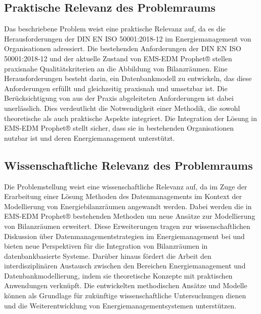 \subsection{Praktische Relevanz des Problemraums} 
Das beschriebene Problem weist eine praktische Relevanz auf, da es die Herausforderungen der DIN EN ISO 50001:2018-12
im Energiemanagement von Organisationen adressiert.
Die bestehenden Anforderungen der DIN EN ISO 50001:2018-12 und der aktuelle Zustand von EMS-EDM Prophet® stellen praxisnahe Qualitätskriterien an die Abbildung von Bilanzräumen.
Eine Herausforderungen besteht darin, ein Datenbankmodell zu entwickeln, das diese Anforderungen erfüllt und gleichzeitig praxisnah und umsetzbar ist.
Die Berücksichtigung von aus der Praxis abgeleiteten Anforderungen ist dabei unerlässlich.
Dies verdeutlicht die Notwendigkeit einer Methodik, die sowohl theoretische als auch praktische Aspekte integriert.
Die Integration der Lösung in EMS-EDM Prophet® stellt sicher, dass sie in bestehenden Organisationen nutzbar ist und deren Energiemanagement unterstützt.

\subsection{Wissenschaftliche Relevanz des Problemraums} 
Die Problemstellung weist eine wissenschaftliche Relevanz auf, da im Zuge der Erarbeitung einer Lösung Methoden des Datenmanagements im Kontext der 
Modellierung von Energiebilanzräumen angewandt werden.
Dabei werden die in EMS-EDM Prophet® bestehenden Methoden um neue Ansätze zur Modellierung von Bilanzräumen erweitert.
Diese Erweiterungen tragen zur wissenschaftlichen Diskussion über Datenmanagementstrategien im Energiemanagement bei und bieten neue Perspektiven für die 
Integration von Bilanzräumen in datenbankbasierte Systeme.
Darüber hinaus fördert die Arbeit den interdisziplinären Austausch zwischen den Bereichen Energiemanagement und Datenbankmodellierung, indem sie 
theoretische Konzepte mit praktischen Anwendungen verknüpft.
Die entwickelten methodischen Ansätze und Modelle können als Grundlage für zukünftige wissenschaftliche Untersuchungen dienen und die Weiterentwicklung 
von Energiemanagementsystemen unterstützen.